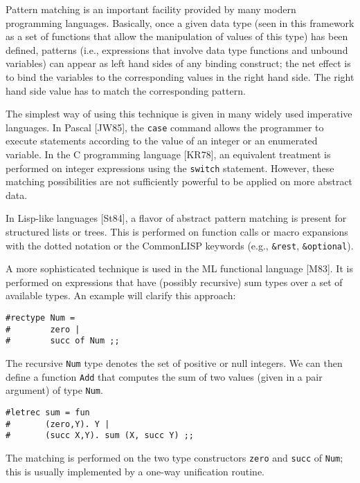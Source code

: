 \begin{sloppypar}
Pattern matching is an important facility provided by many modern
programming languages. Basically, once a given data type (seen in
this framework as a set of functions that allow the manipulation of
values of this type) has been defined, patterns (i.e., expressions
that involve data type functions and unbound variables) can appear as
left hand sides of any binding construct; the net effect is to bind
the variables to the corresponding values in the right hand side. The
right hand side value has to match the corresponding pattern. 

The simplest way of using this technique is given in many widely used
imperative languages. In Pascal [JW85], the {\tt case} command allows the
programmer to execute statements according to the value of an integer
or an enumerated variable. In the C programming language [KR78], an
equivalent treatment is performed on integer expressions using the
{\tt switch} statement. However, these matching possibilities are not
sufficiently powerful to be applied on more abstract data.

In Lisp-like languages [St84], a flavor of abstract pattern matching is
present for structured lists or trees. This is performed on function
calls or macro expansions with the dotted notation or the CommonLISP
keywords (e.g., {\tt \&rest}, {\tt \&optional}).

A more sophisticated technique is used in the ML functional language
[M83].  It is performed on expressions that have (possibly recursive)
sum types over a set of available types. An example will clarify this
approach:
\begin{verbatim}
#rectype Num =
#        zero |
#        succ of Num ;;
\end{verbatim}
The recursive {\tt Num} type denotes the set of positive or null
integers. We can then define a function {\tt Add} that computes the
sum of two values (given in a pair argument) of type {\tt Num}.
\begin{verbatim}
#letrec sum = fun
#       (zero,Y). Y |
#       (succ X,Y). sum (X, succ Y) ;;
\end{verbatim}
The matching is performed on the two type constructors {\tt zero} and
{\tt succ} of {\tt Num}; this is usually implemented by a one-way
unification routine.


\end{sloppypar}
